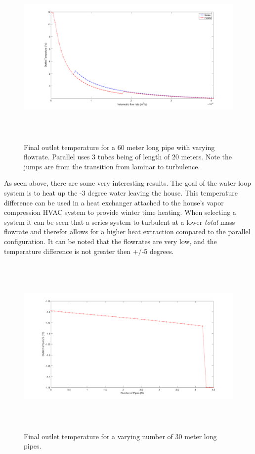 \begin{figure}[H]
    \centering
    \includegraphics[height=3.5in]{pictures/outlet_11_ground_23_inlet.png}
    \caption{Final outlet temperature for a 60 meter long pipe with varying flowrate. Parallel uses 3 tubes being of length of 20 meters. Note the jumps are from the transition from laminar to turbulence.}
\end{figure}
%
\noindent
As seen above, there are some very interesting results. The goal of the water loop system is to heat up the -3 degree water leaving the house. This temperature difference can be used in a heat exchanger attached to the house's vapor compression HVAC system to provide winter time heating. When selecting a system it can be seen that a series system to turbulent at a lower \textit{total} mass flowrate and therefor allows for a higher heat extraction compared to the parallel configuration. It can be noted that the flowrates are very low, and the temperature difference is not greater then +/-5 degrees.
%
\begin{figure}[H]
    \centering
    \includegraphics[height=3.5in]{pictures/outlet_parallel_num_pipes.png}
    \caption{Final outlet temperature for a varying number of 30 meter long pipes.}
\end{figure}
